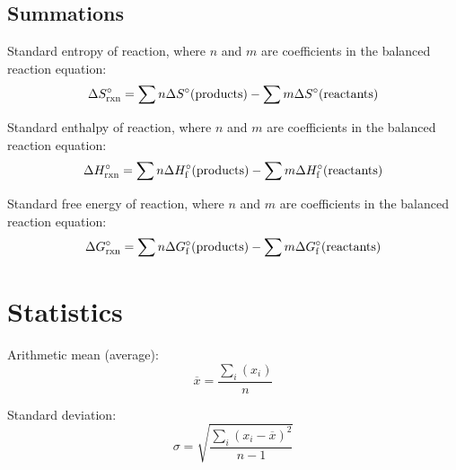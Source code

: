 \documentclass[10pt]{article}
\begin{document}
\subsection{Summations}

Standard entropy of reaction, where $n$ and $m$ are coefficients in the balanced reaction equation:
\begin{equation*}
\Delta S\not_\textnormal{rxn} = \sum{n\Delta S\not(\textnormal{products})}-\sum{m\Delta S\not(\textnormal{reactants})}
\end{equation*}

Standard enthalpy of reaction, where $n$ and $m$ are coefficients in the balanced reaction equation:
\begin{equation*}
\Delta H\not_\textnormal{rxn} = \sum{n\Delta H\not_\textnormal{f}(\textnormal{products})}-\sum{m\Delta H\not_\textnormal{f}(\textnormal{reactants})}
\end{equation*}

Standard free energy of reaction, where $n$ and $m$ are coefficients in the balanced reaction equation:
\begin{equation*}
\Delta G\not_\textnormal{rxn} = \sum{n\Delta G\not_\textnormal{f}(\textnormal{products})}-\sum{m\Delta G\not_\textnormal{f}(\textnormal{reactants})}
\end{equation*}


\newpage
\section{Statistics}

Arithmetic mean (average):
\begin{equation*}
\overline x = \frac{\sum_i(x_i)}{n}
\end{equation*}

Standard deviation:
\begin{equation*}
\sigma = \sqrt{\frac{\sum_i(x_i-\overline x)^2}{n-1}}
\end{equation*}
\end{document}
